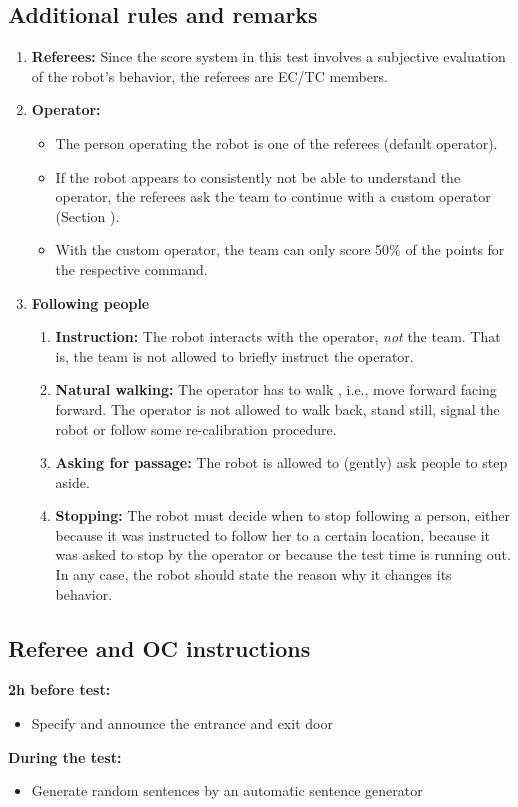 \subsection{Additional rules and remarks}
\begin{enumerate}
	\item \textbf{Referees:} Since the score system in this test involves a subjective evaluation of the robot's behavior, the referees are EC/TC members.
	\item \textbf{Operator:}
	\begin{itemize}
		\item The person operating the robot is one of the referees (default operator).
		\item If the robot appears to consistently not be able to understand the operator, the referees ask the team to continue with a custom operator (Section ).
		\item With the custom operator, the team can only score 50\% of the points for the respective command.
	\end{itemize}
	\item \textbf{Following people} 
	\begin{enumerate}
		\item \textbf{Instruction:} The robot interacts with the operator, \emph{not} the team. That is, the team is not allowed to briefly instruct the operator.
		\item \textbf{Natural walking:} The operator has to walk , i.e., move forward facing forward. The operator is not allowed to walk back, stand still, signal the robot or follow some re-calibration procedure.
		\item \textbf{Asking for passage:} The robot is allowed to (gently) ask people to step aside.
		\item \textbf{Stopping:} The robot must decide when to stop following a person, either because it was instructed to follow her to a certain location, because it was asked to stop by the operator or because the test time is running out. In any case, the robot should state the reason why it changes its behavior.
	\end{enumerate}
\end{enumerate}

\subsection{Referee and OC instructions}
\textbf{2h before test:}
\begin{itemize}
\item Specify and announce the entrance and exit door
\end{itemize}
\textbf{During the test:}
\begin{itemize}
\item Generate random sentences by an automatic sentence generator
\end{itemize}

